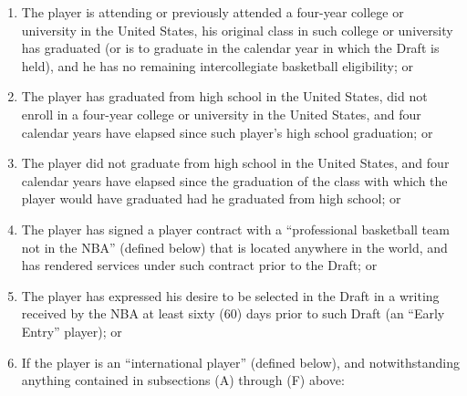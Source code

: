 \documentclass[
]{book}
\providecommand{\tightlist}{%
  \setlength{\itemsep}{0pt}\setlength{\parskip}{0pt}}
\begin{document}
\begin{enumerate}
\begin{enumerate}
\begin{enumerate}
      \begin{enumerate}
      \def\labelenumiv{(\Alph{enumiv})}
      \setcounter{enumiv}{1}
      \tightlist
      \item
        The player is attending or previously attended a four-year college or university in the United States, his original class in such college or university has graduated (or is to graduate in the calendar year in which the Draft is held), and he has no remaining intercollegiate basketball eligibility; or
      \item
        The player has graduated from high school in the United States, did not enroll in a four-year college or university in the United States, and four calendar years have elapsed since such player's high school graduation; or
      \item
        The player did not graduate from high school in the United States, and four calendar years have elapsed since the graduation of the class with which the player would have graduated had he graduated from high school; or
      \item
        The player has signed a player contract with a ``professional basketball team not in the NBA'' (defined below) that is located anywhere in the world, and has rendered services under such contract prior to the Draft; or
      \item
        The player has expressed his desire to be selected in the Draft in a writing received by the NBA at least sixty (60) days prior to such Draft (an ``Early Entry'' player); or
      \item
        If the player is an ``international player'' (defined below), and notwithstanding anything contained in subsections (A) through (F) above:
      \end{enumerate}
    \end{enumerate}


\end{enumerate}
\end{enumerate}
\end{document}
